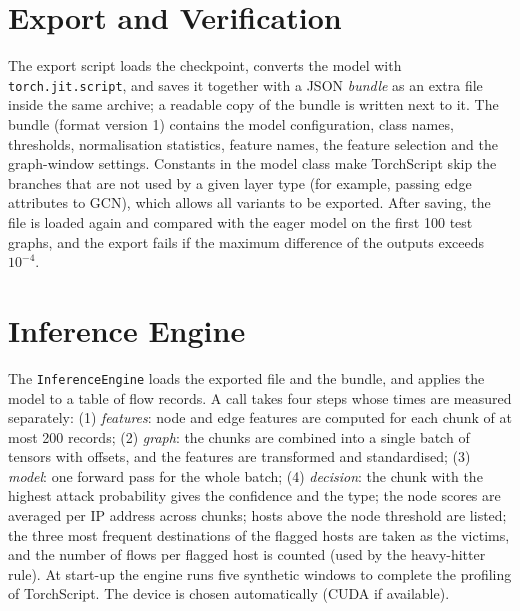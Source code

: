 \section{Export and Verification}
The export script loads the checkpoint, converts the model with \texttt{torch.jit.script}, and saves it together with a JSON \emph{bundle} as an extra file inside the same archive; a readable copy of the bundle is written next to it. The bundle (format version 1) contains the model configuration, class names, thresholds, normalisation statistics, feature names, the feature selection and the graph-window settings. Constants in the model class make TorchScript skip the branches that are not used by a given layer type (for example, passing edge attributes to GCN), which allows all variants to be exported. After saving, the file is loaded again and compared with the eager model on the first 100 test graphs, and the export fails if the maximum difference of the outputs exceeds $10^{-4}$.

\section{Inference Engine}
The \texttt{InferenceEngine} loads the exported file and the bundle, and applies the model to a table of flow records. A call takes four steps whose times are measured separately: (1) \emph{features}: node and edge features are computed for each chunk of at most 200 records; (2) \emph{graph}: the chunks are combined into a single batch of tensors with offsets, and the features are transformed and standardised; (3) \emph{model}: one forward pass for the whole batch; (4) \emph{decision}: the chunk with the highest attack probability gives the confidence and the type; the node scores are averaged per IP address across chunks; hosts above the node threshold are listed; the three most frequent destinations of the flagged hosts are taken as the victims, and the number of flows per flagged host is counted (used by the heavy-hitter rule). At start-up the engine runs five synthetic windows to complete the profiling of TorchScript. The device is chosen automatically (CUDA if available).

